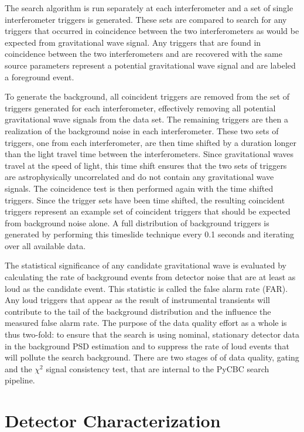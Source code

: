 The search algorithm is run separately at each interferometer and a set of single interferometer
triggers is generated. These sets are compared to search for any triggers that occurred in
coincidence between the two interferometers as would be expected from gravitational wave
signal. Any triggers that are found in coincidence between the two interferometers and
are recovered with the same source parameters represent a potential gravitational wave signal
and are labeled a foreground event.

To generate the background, all coincident triggers are removed
from the set of triggers generated for each interferometer, effectively removing all
potential gravitational wave signals from the data set. The remaining triggers are then
a realization of the background noise in each interferometer. These two sets of triggers,
one from each interferometer, are then time shifted by a duration longer than the
light travel time between the interferometers.
Since gravitational waves travel at the speed of light, this time shift ensures that the
two sets of triggers are astrophysically uncorrelated and do not contain any gravitational
wave signals. The coincidence test is then performed again with the time shifted triggers.
Since the trigger sets have been time shifted, the resulting coincident triggers
represent an example set of coincident triggers that should be expected from background noise alone.
A full distribution of background triggers is generated by performing this timeslide
technique every 0.1 seconds and iterating over all available data.

The statistical significance of any candidate gravitational wave is
evaluated by calculating the rate of background events from detector noise that are at least as
loud as the candidate event. This statistic is called the false alarm rate (FAR).
Any loud triggers that appear as the result of instrumental
transients will contribute to the tail of the background distribution and
the influence the measured false alarm rate.
The purpose of the data quality effort as a whole is thus two-fold: to ensure that the
search is using nominal, stationary
detector data in the background PSD estimation and to suppress the rate of loud events
that will pollute the search background.
There are two stages of
of data quality, gating and the $\chi^{2}$ signal consistency test, that are internal to the PyCBC search
pipeline.



\section{Detector Characterization}

